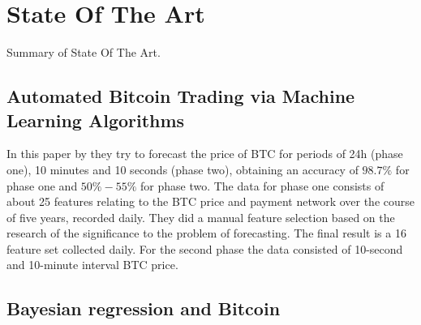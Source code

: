 
\chapter{State Of The Art} %

\label{ch:state-of-the-art}


Summary of State Of The Art.


\section{Automated Bitcoin Trading via Machine Learning Algorithms}

In this paper by \cite{madan_automated_2014} they try to forecast the
price of BTC for periods of 24h (phase one), 10 minutes and 10 seconds
(phase two), obtaining an accuracy of $98.7\%$ for phase one and
$50\% - 55\%$ for phase two. The data for phase one consists of about
25 features relating to the BTC price and payment network over the
course of five years, recorded daily. They did a manual feature
selection based on the research of the significance to the problem of
forecasting. The final result is a 16 feature set collected daily. For
the second phase the data consisted of 10-second and 10-minute
interval BTC price.


\section{Bayesian regression and Bitcoin}



